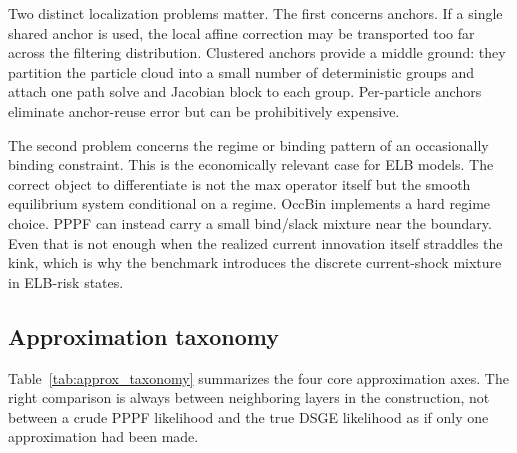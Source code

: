 \documentclass[11pt]{article}
\theoremstyle{remark}
\begin{document}
Two distinct localization problems matter.
The first concerns anchors.
If a single shared anchor is used, the local affine correction may be transported too far across the filtering distribution.
Clustered anchors provide a middle ground: they partition the particle cloud into a small number of deterministic groups and attach one path solve and Jacobian block to each group.
Per-particle anchors eliminate anchor-reuse error but can be prohibitively expensive.

The second problem concerns the regime or binding pattern of an occasionally binding constraint.
This is the economically relevant case for ELB models.
The correct object to differentiate is not the max operator itself but the smooth equilibrium system conditional on a regime.
OccBin \citep{GuerrieriIacoviello2015} implements a hard regime choice.
PPPF can instead carry a small bind/slack mixture near the boundary.
Even that is not enough when the realized current innovation itself straddles the kink, which is why the benchmark introduces the discrete current-shock mixture in ELB-risk states.

\subsection{Approximation taxonomy}

Table~\ref{tab:approx_taxonomy} summarizes the four core approximation axes.
The right comparison is always between neighboring layers in the construction, not between a crude PPPF likelihood and the true DSGE likelihood as if only one approximation had been made.
\end{document}
